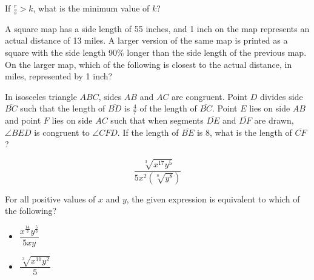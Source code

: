 If \(\frac{r}{s} > k\), what is the minimum value of \(k\)?

\vspace{2em}
\newpage

\noindent\markforreview
\vspace{1em}

A square map has a side length of 55 inches, and 1 inch on the map represents an actual distance of 13 miles.
A larger version of the same map is printed as a square with the side length 90\% longer than the side length of the previous map.
On the larger map, which of the following is closest to the actual distance, in miles, represented by 1 inch?

\vspace{0.75em}


\vspace{2em}
\newpage

\noindent\markforreview
\vspace{1em}

In isosceles triangle \(ABC\), sides \(AB\) and \(AC\) are congruent.
Point \(D\) divides side \(\overline{BC}\) such that the length of \(\overline{BD}\) is \(\frac{4}{7}\) of the length of \(\overline{BC}\).
Point \(E\) lies on side \(AB\) and point \(F\) lies on side \(AC\) such that when segments \(\overline{DE}\) and \(\overline{DF}\) are drawn, \(\angle BED\) is congruent to \(\angle CFD\).
If the length of \(\overline{BE}\) is 8, what is the length of \(\overline{CF}\)?

\vspace{0.75em}


\vspace{2em}
\newpage

\noindent\markforreview
\vspace{1em}

\[
\frac{\sqrt[3]{x^{17}y^5}}{5x^2\left(\sqrt[8]{y^8}\right)}
\]

For all positive values of \(x\) and \(y\), the given expression is equivalent to which of the following?

\begin{itemize}
\item[I] \(\dfrac{x^{\frac{14}{3}}y^{\frac{5}{3}}}{5xy}\)
\item[II] \(\dfrac{\sqrt[3]{x^{11}y^2}}{5}\)
\end{itemize}

